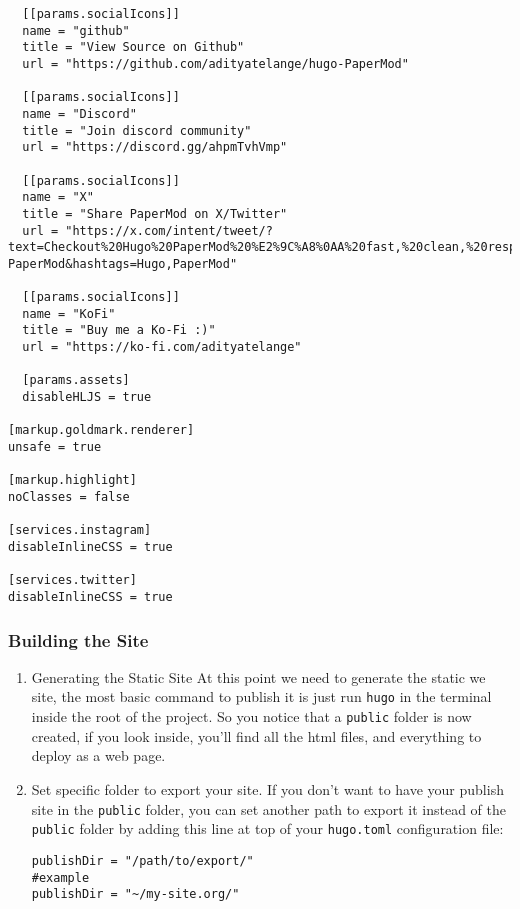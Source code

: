 \documentclass[11pt]{article}
\begin{document}
\begin{verbatim}
  [[params.socialIcons]]
  name = "github"
  title = "View Source on Github"
  url = "https://github.com/adityatelange/hugo-PaperMod"

  [[params.socialIcons]]
  name = "Discord"
  title = "Join discord community"
  url = "https://discord.gg/ahpmTvhVmp"

  [[params.socialIcons]]
  name = "X"
  title = "Share PaperMod on X/Twitter"
  url = "https://x.com/intent/tweet/?text=Checkout%20Hugo%20PaperMod%20%E2%9C%A8%0AA%20fast,%20clean,%20responsive%20Hugo%20theme.&url=https://github.com/adityatelange/hugo-PaperMod&hashtags=Hugo,PaperMod"

  [[params.socialIcons]]
  name = "KoFi"
  title = "Buy me a Ko-Fi :)"
  url = "https://ko-fi.com/adityatelange"

  [params.assets]
  disableHLJS = true

[markup.goldmark.renderer]
unsafe = true

[markup.highlight]
noClasses = false

[services.instagram]
disableInlineCSS = true

[services.twitter]
disableInlineCSS = true
\end{verbatim}
\subsubsection{Building the Site}
\label{sec:org2643074}
\begin{enumerate}
\item Generating the Static Site
\label{sec:org68afc26}
At this point we need to generate the static we site, the most basic command to publish it is just run \texttt{hugo} in the terminal inside the root of the project.
So you notice that a \texttt{public} folder is now created, if you look inside, you'll find all the html files, and everything to deploy as a web page.
\item Set specific folder to export your site.
\label{sec:org6b72fa2}
If you don't want to have your publish site in the \texttt{public} folder, you can set another path to export it instead of the \texttt{public} folder by adding this line at top of your \texttt{hugo.toml} configuration file:

\begin{verbatim}
publishDir = "/path/to/export/"
#example
publishDir = "~/my-site.org/"
\end{verbatim}
\end{enumerate}
\end{document}
